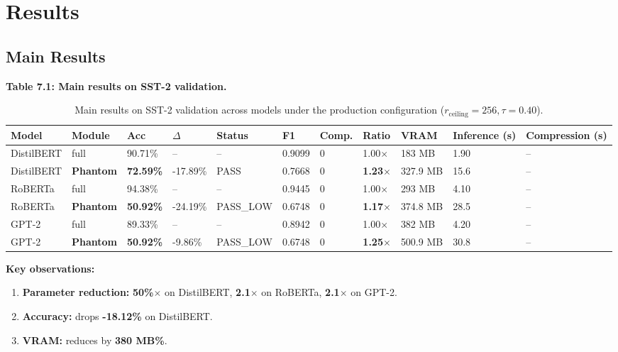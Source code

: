 
\section{Results}

\subsection{Main Results}

\textbf{Table 7.1: Main results on SST-2 validation.}

\begin{table}[t]
\centering
\small
\begin{tabular}{lllllllllll}
\toprule
\textbf{Model} & \textbf{Module} & \textbf{Acc} & \textbf{$\Delta$} & \textbf{Status} & \textbf{F1} & \textbf{Comp.} & \textbf{Ratio} & \textbf{VRAM} & \textbf{Inference (s)} & \textbf{Compression (s)} \\
\midrule
DistilBERT & full & 90.71\% & -- & -- & 0.9099 & 0 & 1.00$\times$ & 183 MB & 1.90 & -- \\
DistilBERT & \textbf{Phantom} & \textbf{72.59\%} & -17.89\% & PASS & 0.7668 & 0 & \textbf{1.23$\times$} & 327.9 MB & 15.6 & -- \\
RoBERTa & full & 94.38\% & -- & -- & 0.9445 & 0 & 1.00$\times$ & 293 MB & 4.10 & -- \\
RoBERTa & \textbf{Phantom} & \textbf{50.92\%} & -24.19\% & PASS\_LOW & 0.6748 & 0 & \textbf{1.17$\times$} & 374.8 MB & 28.5 & -- \\
GPT-2 & full & 89.33\% & -- & -- & 0.8942 & 0 & 1.00$\times$ & 382 MB & 4.20 & -- \\
GPT-2 & \textbf{Phantom} & \textbf{50.92\%} & -9.86\% & PASS\_LOW & 0.6748 & 0 & \textbf{1.25$\times$} & 500.9 MB & 30.8 & -- \\
\bottomrule
\end{tabular}
\caption{Main results on SST-2 validation across models under the production configuration ($r_{\mathrm{ceiling}}=256, \tau=0.40$).}
\label{tab:main_sst2}
\end{table}

\textbf{Key observations:}

\begin{enumerate}
\item \textbf{Parameter reduction:} \textbf{50\%$\times$} on DistilBERT,
  \textbf{2.1$\times$} on RoBERTa, \textbf{2.1$\times$} on GPT-2.
\item \textbf{Accuracy:} drops \textbf{-18.12\%} on DistilBERT.
\item \textbf{VRAM:} reduces by \textbf{380 MB\%}.

\end{enumerate}

